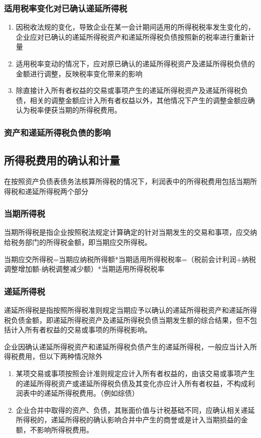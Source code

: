 \documentclass[UTF8,12pt]{ctexart}
\numberwithin{equation}{section} %
\numberwithin{figure}{section}
\numberwithin{table}{section}
\begin{document}
	
	\subsubsection{适用税率变化对已确认递延所得税}
	\begin{enumerate}
		\item 因税收法规的变化，导致企业在某一会计期间适用的所得税税率发生变化的，企业应对已确认的递延所得税资产和递延所得税负债按照新的税率进行重新计量
		
		\item 适用税率变动的情况下，应对原已确认的递延所得税资产及递延所得税负债的金额进行调整，反映税率变化带来的影响
		
		\item 除直接计入所有者权益的交易或事项产生的递延所得税资产及递延所得税负债，相关的调整金额应计入所有者权益以外，其他情况下产生的调整金额应确认为税率便获当期的所得税费用。
	\end{enumerate}
	\subsubsection{资产和递延所得税负债的影响}
	
	\subsection{所得税费用的确认和计量}
	在按照资产负债表债务法核算所得税的情况下，利润表中的所得税费用包括当期所得税和递延所得税两个部分
	\subsubsection{当期所得税}
	当期所得税是指企业按照税法规定计算确定的针对当期发生的交易和事项，应交纳给税务部门的所得税金额，即当期应交所得税。
	
	当期应交所得税=当期应纳税所得额*当期适用所得税税率=（税前会计利润+纳税调整增加额-纳税调整减少额）*当期适用所得税税率
	\subsubsection{递延所得税}
	递延所得税是指按照所得税准则规定当期应予以确认的递延所得税资产和递延所得税负债金额，即递延所得税资产及递延所得税负债当期发生额的综合结果，但不包括计入所有者权益的交易或事项的所得税影响。
	
	企业因确认递延所得税资产和递延所得税负债产生的递延所得税，一般应当计入所得税费用，但以下两种情况除外
	\begin{enumerate}
		\item 某项交易或事项按照会计准则规定应计入所有者权益的，由该交易或事项产生的递延所得税资产或递延所得税负债及其变化亦应计入所有者权益，不构成利润表中的递延所得税费用。（例如综债）
		
		\item 企业合并中取得的资产、负债，其账面价值与计税基础不同，应确认相关递延所得税的，递延所得税的确认影响合并中产生的商誉或是计入当期损益的金额，不影响所得税费用。
	\end{enumerate}
\end{document}

